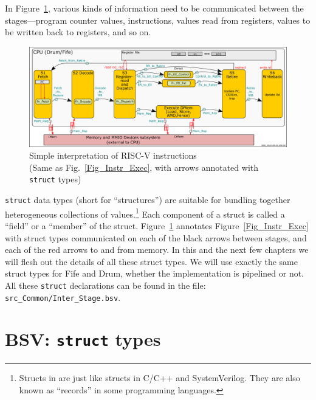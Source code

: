 In Figure~\ref{Fig_Simple_Instr_Exec_w_structs}, various kinds of
information need to be communicated between the stages---program
counter values, instructions, values read from registers, values to be
written back to registers, and so on.
\begin{figure}[htbp]
  \centerline{\includegraphics[width=6in,angle=0]{Figures/RSN_2025-09-01.000.00_FifeDrum_Stages_Multilayer_L1_L3}}
  \caption{\label{Fig_Simple_Instr_Exec_w_structs}
           Simple interpretation of RISC-V instructions \\
	   \hmmmm\hmm (Same as Fig.~\ref{Fig_Instr_Exec}, with arrows annotated with {\tt struct} types)}
\end{figure}
\verb|struct| data types (short for ``structures'') are suitable for
bundling together heterogeneous collections of
values.\footnote{Structs in {\BSV} are just like structs in C/C++ and
SystemVerilog.  They are also known as ``records'' in some programming
languages.}  Each component of a struct is called a ``field'' or a
``member'' of the struct.
Figure~\ref{Fig_Simple_Instr_Exec_w_structs} annotates
Figure~\ref{Fig_Instr_Exec} with struct types communicated on each of
the black arrows between stages, and each of the red arrows to and
from memory.  In this and the next few chapters we will flesh out the
details of all these struct types.  We will use exactly the same
struct types for Fife and Drum, {\ie} whether the implementation is
pipelined or not.  All these \verb|struct| declarations can be found
in the file: \verb|src_Common/Inter_Stage.bsv|.


\section{BSV: {\tt struct} types}

\label{BSV_struct_types}
\label{Sec_Mem_Req}

